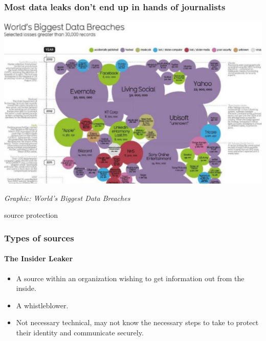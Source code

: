 \documentclass[aspectratio=169,usenames,dvipsnames]{beamer}
\begin{document}
\begin{frame}
  \frametitle{Most data leaks don't end up in hands of journalists}

  \centering \footnotesize

  \includegraphics[width=\textwidth,height=0.7\textheight,keepaspectratio]{img/biggest_data_breaches.png}

  \emph{Graphic: World's Biggest Data Breaches}
\end{frame}

\begin{frame}[c]

  \centering \LARGE
  source protection

\end{frame}
\begin{frame}
  \frametitle{Types of sources}
  \framesubtitle{The Insider Leaker}

  \begin{itemize}[<+->]
    \item A source within an organization wishing to get information out from
      the inside.
    \item A whistleblower.
    \item Not necessary technical, may not know the necessary steps to take to
      protect their identity and communicate securely.
  \end{itemize}

\end{frame}
\end{document}

